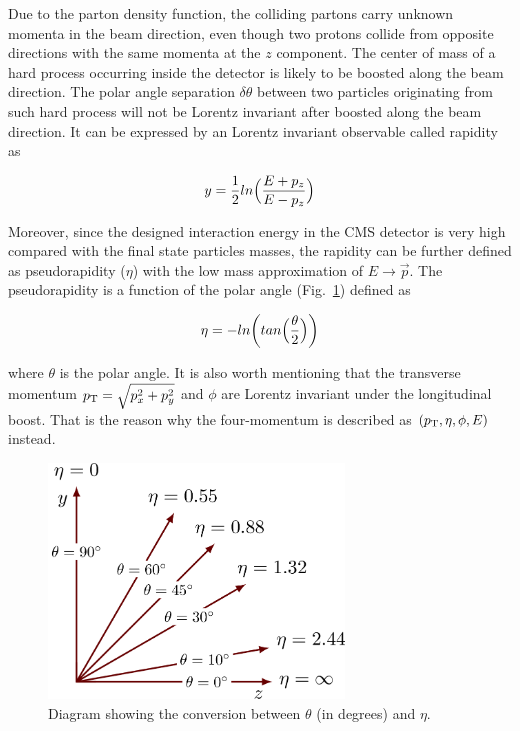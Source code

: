 Due to the parton density function, the colliding partons carry unknown momenta in the beam direction, even though two protons collide from opposite directions with the same momenta at the $z$ component.
The center of mass of a hard process occurring inside the detector is likely to be boosted along the beam direction.
The polar angle separation $\delta\theta$ between two particles originating from such hard process will not be Lorentz invariant after boosted along the beam direction.
It can be expressed by an Lorentz invariant observable called rapidity as
\begin{linenomath}\begin{equation}\label{eq:cms_rap}
    y = \frac{1}{2}ln \Bigl(\frac{E+p_z}{E-p_z}\Bigr)
\end{equation}\end{linenomath}
Moreover, since the designed interaction energy in the CMS detector is very high compared with the final state particles masses, the rapidity can be further defined as pseudorapidity ($\eta$) with the low mass approximation of $E \rightarrow \vec{p}$.
The pseudorapidity is a function of the polar angle (Fig.~\ref{fig:cms_eta_theta}) defined as
\begin{linenomath}\begin{equation}\label{eq:cms_eta}
    \eta = -ln \biggl(tan\Bigl(\frac{\theta}{2}\Bigr) \biggr)
\end{equation}\end{linenomath}
where $\theta$ is the polar angle.
It is also worth mentioning that the transverse momentum $p_{\mathrm{T}}=\sqrt{p^2_x+p^2_y}$ and $\phi$ are Lorentz invariant under the longitudinal boost.
That is the reason why the four-momentum is described as $(p_{\mathrm{T}}, \eta, \phi, E)$ instead.
\begin{figure}\centering
    \includegraphics[width=0.7\textwidth]{figure/cms_eta_theta.png}
    \caption{Diagram showing the conversion between $\theta$ (in degrees) and $\eta$.}
    \label{fig:cms_eta_theta}
\end{figure}

